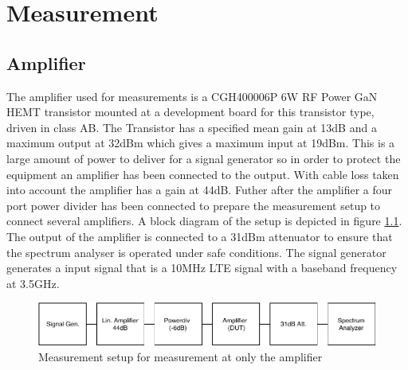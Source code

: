 \chapter{Measurement}\label{ch:measurement}


\section{Amplifier}

The amplifier used for measurements is a CGH400006P 6W RF Power GaN HEMT transistor mounted at a development board for this transistor type, driven in class AB. The Transistor has a specified mean gain at 13dB and a maximum output at 32dBm which gives a maximum input at 19dBm. This is a large amount of power to deliver for a signal generator so in order to protect the equipment an amplifier has been connected to the output. With cable loss taken into account the amplifier has a gain at 44dB. Futher after the amplifier a four port power divider has been connected to prepare the measurement setup to connect several amplifiers. A block diagram of the setup is depicted in figure \ref{fig:meas_amp}. The output of the amplifier is connected to a 31dBm attenuator to ensure that the spectrum analyser is operated under safe conditions. The signal generator generates a input signal that is a 10MHz LTE signal with a baseband frequency at 3.5GHz.   



\begin{figure}[H]
\centering 
\includegraphics[scale = 0.9]{figures/measurement/cree/meas1/meas_set_1.pdf}
\caption{Measurement setup for measurement at only the amplifier }
\label{fig:meas_amp}
\end{figure}

